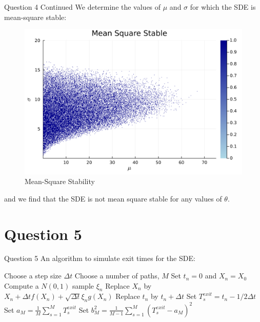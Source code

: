 \documentclass[compress,12pt]{beamer}
\begin{document}
\begin{frame}{Question 4 Continued}
      We determine the values of $\mu$ and $\sigma$ for which the SDE is mean-square stable:
      \begin{figure}
            \centering
            \includegraphics[scale=0.03]{imgs/4mean_square_stable.png}
            \caption{Mean-Square Stability}
            \label{fig:4c}
      \end{figure}
      and we find that the SDE is not mean square stable for any values of $\theta$.
\end{frame}



\section{Question 5}
\begin{frame}{Question 5}
An algorithm to simulate exit times for the SDE:
\begin{algorithmic}[1]
    \State Choose a step size $\Delta t$
    \State Choose a number of paths, $M$
        \State Set $t_n = 0$ and $X_n = X_0$
            \State Compute a $N(0,1)$ sample $\xi_n$
            \State Replace $X_n$ by $X_n + \Delta t f(X_n) + \sqrt{\Delta t} \xi_n g(X_n)$
            \State Replace $t_n$ by $t_n + \Delta t$
        \EndWhile
        \State Set $T_s^{exit} = t_n - 1/2 \Delta t$
    \EndFor
    \State Set $a_M = \frac{1}{M} \sum_{s=1}^{M} T_s^{exit}$
    \State Set $b^2_M = \frac{1}{M-1} \sum_{s=1}^{M} (T_s^{exit} - a_M)^2$
\end{algorithmic}
\end{frame}
\end{document}
